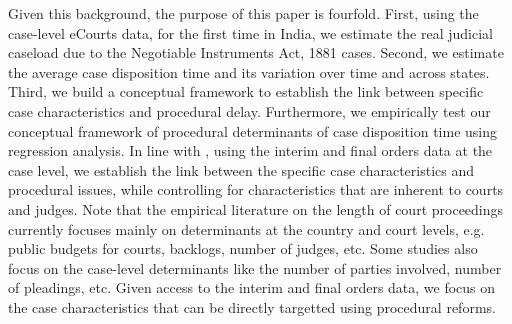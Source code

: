 \documentclass[12pt,a4paper]{article}
\begin{document}

	
	
	Given this background, the purpose of this paper is fourfold. First, using the case-level eCourts data, for the first time in India, we estimate the real judicial caseload due to the Negotiable Instruments Act, 1881 cases. Second, we estimate the average case disposition time and its variation over time and across states. 
Third, we build a conceptual framework to establish the link between specific case characteristics and procedural delay. Furthermore, we empirically test our conceptual framework of procedural determinants of case disposition time using regression analysis. In line with \cite{bielen2015}, using the interim and final orders data at the case level, we establish the link between the specific case characteristics and procedural issues, while controlling for characteristics that are inherent to courts and judges. Note that the empirical literature on the length of court proceedings currently focuses mainly on determinants at the country and court levels, e.g. public budgets for courts, backlogs, number of judges, etc. Some studies also focus on the case-level determinants like the number of parties involved, number of pleadings, etc. Given access to the interim and final orders data, we focus on the case characteristics that can be directly targetted using procedural reforms. 
\end{document}
